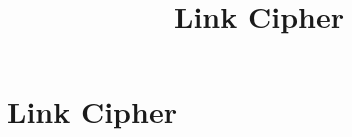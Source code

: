 \documentclass[../../OAE-SPEC-MAIN.tex]{subfiles}
\title{Link Cipher}\label{sec:link-cipher}
\begin{document}

\chapter{Link Cipher}



%
%
\end{document}
